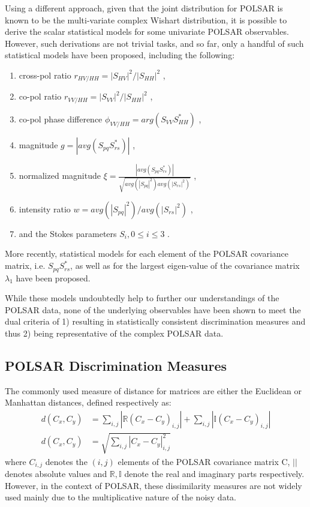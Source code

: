 \documentclass[journal]{IEEEtran}
\begin{document}
Using a different approach, given that the joint distribution for POLSAR is known to be the multi-variate complex Wishart distribution,
  it is possible to derive the scalar statistical models for some univariate POLSAR observables.
However, such derivations are not trivial tasks, and so far, only a handful of such statistical models have been proposed, including the following:
  \begin{enumerate}
  \item cross-pol ratio $r_{HV/HH} = |S_{HV}|^2/|S_{HH}|^2$ \cite{Joughin_1994_TGRS_562},
  \item co-pol ratio $r_{VV/HH} = |S_{VV}|^2/|S_{HH}|^2$ \cite{Joughin_1994_TGRS_562},
  \item co-pol phase difference $\phi_{VV/HH} = arg(S_{VV}S_{HH}^*) $ \cite{Joughin_1994_TGRS_562} \cite{Lee_1994_TGRS_1017},
  \item magnitude $g=|avg(S_{pq}S_{rs}^*)|$ \cite{Lee_1994_TGRS_1017},
  \item normalized magnitude $\xi = \frac{|avg(S_{pq}S_{rs}^*)|}{\sqrt{avg(|S_{pq}|^2) avg(|S_{rs}|^2)}}$ \cite{Lee_1994_TGRS_1017},
  \item intensity ratio $w = avg(|S_{pq}|^2)/avg(|S_{rs}|^2)$ \cite{Lee_1994_TGRS_1017},
  \item and the Stokes parameters $S_i,0 \leq i \leq 3$ \cite{Touzi_1996_TGRS_519}. 
  \end{enumerate}
More recently, statistical models for
  each element of the POLSAR covariance matrix, i.e. $S_{pq}S_{rs}^*$, \cite{Lopez-Martinez_2003_TGRS_2232}
  as well as for the largest eigen-value of the covariance matrix $\lambda_1$ \cite{Erten_2012_Sensors_2766} have been proposed.

While these models undoubtedly help to further our understandings of the POLSAR data,
  none of the underlying observables have been shown to meet the dual criteria of
  1) resulting in statistically consistent discrimination measures and thus 
  2) being representative of the complex POLSAR data.

\subsection{POLSAR Discrimination Measures}
\label{sec:lit_measures}

The commonly used measure of distance for matrices are either the Euclidean or Manhattan distances, defined respectively as:
\begin{align}
  d(C_x,C_y) &= \sum_{i,j} |\mathbb{R} (C_x - C_y)_{i,j}| + \sum_{i,j} |\mathbb{I} (C_x - C_y)_{i,j}| \\
  d(C_x,C_y) &= \sqrt{\sum_{i,j} |C_x - C_y|_{i,j}^2 }
\end{align}
where $C_{i,j}$ denotes the $(i,j)$ elements of the POLSAR covariance matrix C,
 $||$ denotes absolute values
and $\mathbb{R},\mathbb{I}$ denote the real and imaginary parts respectively.
However, in the context of POLSAR, %
  these dissimilarity measures are not widely used 
  mainly due to the multiplicative nature of the noisy data.
\end{document}
